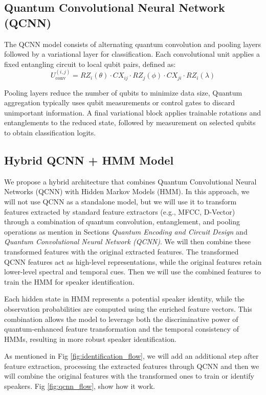 \documentclass[conference]{IEEEtran}
\begin{document}
\subsection{Quantum Convolutional Neural Network (QCNN)}

The QCNN model consists of alternating quantum convolution and pooling layers followed by a variational layer for classification. Each convolutional unit applies a fixed entangling circuit to local qubit pairs, defined as:
\[
    U^{(i,j)}_{\text{conv}} = RZ_i(\theta) \cdot CX_{ij} \cdot RZ_j(\phi) \cdot CX_{ji} \cdot RZ_i(\lambda)
\]

Pooling layers reduce the number of qubits to minimize data size, Quantum aggregation typically uses qubit measurements or control gates to discard unimportant information. A final variational block applies trainable rotations and entanglements to the reduced state, followed by measurement on selected qubits to obtain classification logits.

\subsection{Hybrid QCNN + HMM Model}

We propose a hybrid architecture that combines Quantum Convolutional Neural Networks (QCNN) with Hidden Markov Models (HMM). In this approach, we will not use QCNN as a standalone model, but we will use it to transform features extracted by standard feature extractors (e.g., MFCC, D-Vector) through a combination of quantum convolution, entanglement, and pooling operations as mention in Sections \textit{Quantum Encoding and Circuit Design} and \textit{Quantum Convolutional Neural Network (QCNN)}. We will then combine these transformed features with the original extracted features. The transformed QCNN features act as high-level representations, while the original features retain lower-level spectral and temporal cues. Then we will use the combined features to train the HMM for speaker identification.

Each hidden state in HMM represents a potential speaker identity, while the observation probabilities are computed using the enriched feature vectors. This combination allows the model to leverage both the discriminative power of quantum-enhanced feature transformation and the temporal consistency of HMMs, resulting in more robust speaker identification.

As mentioned in Fig \ref{fig:identification_flow}, we will add an additional step after feature extraction, processing the extracted features through QCNN and then we will combine the original features with the transformed ones to train or identify speakers. Fig \ref{fig:qcnn_flow}, show how it work.
\end{document}
